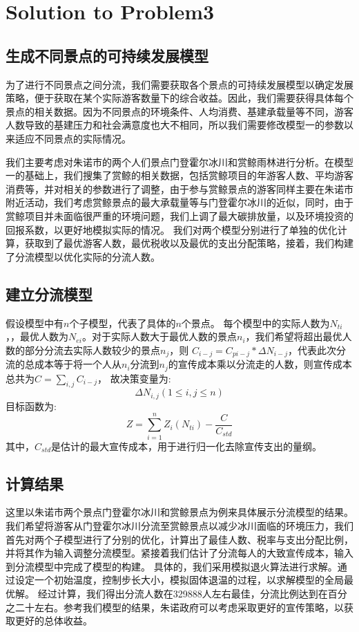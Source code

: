 \documentclass[12pt]{article}  %
\begin{document}
\section{Solution to Problem3}
\subsection{生成不同景点的可持续发展模型}
为了进行不同景点之间分流，我们需要获取各个景点的可持续发展模型以确定发展策略，便于获取在某个实际游客数量下的综合收益。因此，我们需要获得具体每个景点的相关数据。因为不同景点的环境条件、人均消费、基建承载量等不同，游客人数导致的基建压力和社会满意度也大不相同，所以我们需要修改模型一的参数以来适应不同景点的实际情况。

我们主要考虑对朱诺市的两个人们景点门登霍尔冰川和赏鲸雨林进行分析。在模型一的基础上，我们搜集了赏鲸的相关数据，包括赏鲸项目的年游客人数、平均游客消费等，并对相关的参数进行了调整，由于参与赏鲸景点的游客同样主要在朱诺市附近活动，我们考虑赏鲸景点的最大承载量等与门登霍尔冰川的近似，同时，由于赏鲸项目并未面临很严重的环境问题，我们上调了最大碳排放量，以及环境投资的回报系数，以更好地模拟实际的情况。
我们对两个模型分别进行了单独的优化计算，获取到了最优游客人数，最优税收以及最优的支出分配策略，接着，我们构建了分流模型以优化实际的分流人数。
\subsection{建立分流模型}
假设模型中有$n$个子模型，代表了具体的$n$个景点。
每个模型中的实际人数为$N_{ti}$，，最优人数为$N_{ei}$。对于实际人数大于最优人数的景点$n_i$，我们希望将超出最优人数的部分分流去实际人数较少的景点$n_j$，则
$C_{i-j} = C_{pi-j}*\Delta N_{i-j}$，代表此次分流的总成本等于将一个人从$n_i$分流到$n_j$的宣传成本乘以分流走的人数，则宣传成本总共为$C = \sum_{i,j} C_{i-j}$，
故决策变量为:
\begin{equation}
    \Delta N_{i,j} (1 \leq i,j \leq n)
\end{equation}
目标函数为:
\begin{equation}
	Z = \sum_{i=1}^{n} Z_i(N_{ti}) - \frac{C}{C_{std}}
\end{equation}
其中，$C_{std}$是估计的最大宣传成本，用于进行归一化去除宣传支出的量纲。
\subsection{计算结果}
这里以朱诺市两个景点门登霍尔冰川和赏鲸景点为例来具体展示分流模型的结果。
我们希望将游客从门登霍尔冰川分流至赏鲸景点以减少冰川面临的环境压力，我们首先对两个子模型进行了分别的优化，计算出了最佳人数、税率与支出分配比例，并将其作为输入调整分流模型。紧接着我们估计了分流每人的大致宣传成本，输入到分流模型中完成了模型的构建。
具体的，我们采用模拟退火算法进行求解。通过设定一个初始温度，控制步长大小，模拟固体退温的过程，以求解模型的全局最优解。
经过计算，我们得出分流人数在329888人左右最佳，分流比例达到在百分之二十左右。参考我们模型的结果，朱诺政府可以考虑采取更好的宣传策略，以获取更好的总体收益。
\end{document}
